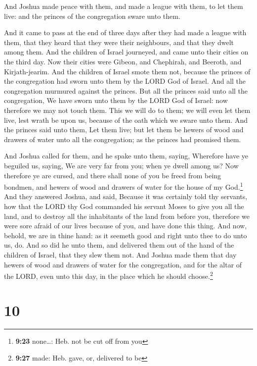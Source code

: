  And Joshua made peace with them, and made a league with
them, to let them live: and the princes of the congregation sware unto
them.

 And it came to pass at the end of three days after they
had made a league with them, that they heard that they were their
neighbours, and that they dwelt among them.  And the
children of Israel journeyed, and came unto their cities on the third
day. Now their cities were Gibeon, and Chephirah, and Beeroth, and
Kirjath-jearim.  And the children of Israel smote them
not, because the princes of the congregation had sworn unto them by the
LORD God of Israel. And all the congregation murmured against the
princes.  But all the princes said unto all the
congregation, We have sworn unto them by the LORD God of Israel: now
therefore we may not touch them.  This we will do to
them; we will even let them live, lest wrath be upon us, because of the
oath which we sware unto them.  And the princes said unto
them, Let them live; but let them be hewers of wood and drawers of water
unto all the congregation; as the princes had promised them.

 And Joshua called for them, and he spake unto them,
saying, Wherefore have ye beguiled us, saying, We are very far from you;
when ye dwell among us?  Now therefore ye are cursed, and
there shall none of you be freed from being bondmen, and hewers of wood
and drawers of water for the house of my God.\footnote{\textbf{9:23}
  none\ldots: Heb. not be cut off from you}  And they
answered Joshua, and said, Because it was certainly told thy servants,
how that the LORD thy God commanded his servant Moses to give you all
the land, and to destroy all the inhabitants of the land from before
you, therefore we were sore afraid of our lives because of you, and have
done this thing.  And now, behold, we are in thine hand:
as it seemeth good and right unto thee to do unto us, do.
 And so did he unto them, and delivered them out of the
hand of the children of Israel, that they slew them not. 
And Joshua made them that day hewers of wood and drawers of water for
the congregation, and for the altar of the LORD, even unto this day, in
the place which he should choose.\footnote{\textbf{9:27} made: Heb.
  gave, or, delivered to be}

\hypertarget{section-9}{%
\section{10}\label{section-9}}

